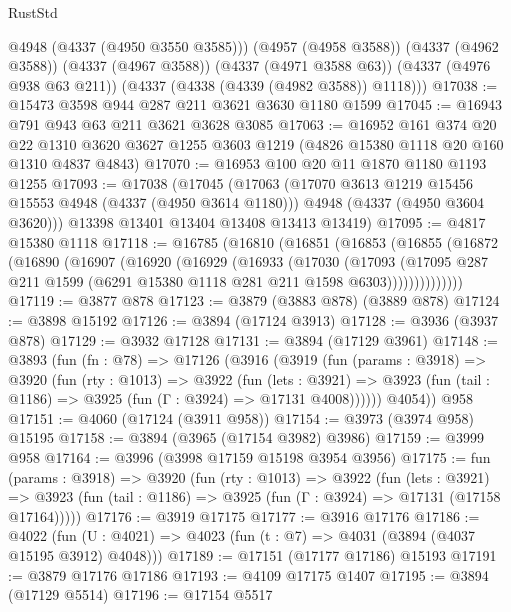 \begin{lexlean}{RustStd}
\begin{coremodule}
        @4948
        (@4337 (@4950 @3550 @3585)))
      (@4957 (@4958 @3588))
      (@4337 (@4962 @3588))
      (@4337 (@4967 @3588))
      (@4337 (@4971 @3588 @63))
      (@4337 (@4976 @938 @63 @211))
      (@4337 (@4338 (@4339 (@4982 @3588)) @1118)))
@17038 := @15473 @3598 @944 @287 @211 @3621 @3630 @1180 @1599
@17045 := @16943 @791 @943 @63 @211 @3621 @3628 @3085
@17063 := @16952
    @161
    @374
    @20
    @22
    @1310
    @3620
    @3627
    @1255
    @3603
    @1219
    (@4826 @15380 @1118 @20 @160 @1310 @4837 @4843)
@17070 := @16953 @100 @20 @11 @1870 @1180 @1193 @1255
@17093 := @17038
    (@17045
      (@17063
        (@17070 @3613 @1219 @15456 @15553 @4948 (@4337 (@4950 @3614 @1180)))
        @4948
        (@4337 (@4950 @3604 @3620)))
      @13398
      @13401
      @13404
      @13408
      @13413
      @13419)
@17095 := @4817 @15380 @1118
@17118 := @16785
    (@16810
      (@16851
        (@16853
          (@16855
            (@16872
              (@16890
                (@16907
                  (@16920
                    (@16929
                      (@16933
                        (@17030
                          (@17093
                            (@17095
                              @287
                              @211
                              @1599
                              (@6291 @15380 @1118 @281 @211 @1598 @6303))))))))))))))
@17119 := @3877 @878
@17123 := @3879 (@3883 @878) (@3889 @878)
@17124 := @3898 @15192
@17126 := @3894 (@17124 @3913)
@17128 := @3936 (@3937 @878)
@17129 := @3932 @17128
@17131 := @3894 (@17129 @3961)
@17148 := @3893
    (fun (fn : @78) =>
    @17126
      (@3916
        (@3919
          (fun (params : @3918) =>
          @3920
            (fun (rty : @1013) =>
            @3922
              (fun (lets : @3921) =>
              @3923 (fun (tail : @1186) => @3925 (fun (Γ : @3924) => @17131 @4008))))))
        @4054))
    @958
@17151 := @4060 (@17124 (@3911 @958))
@17154 := @3973 (@3974 @958) @15195
@17158 := @3894 (@3965 (@17154 @3982) @3986)
@17159 := @3999 @958
@17164 := @3996 (@3998 @17159 @15198 @3954 @3956)
@17175 := fun (params : @3918) =>
  @3920
    (fun (rty : @1013) =>
    @3922
      (fun (lets : @3921) =>
      @3923 (fun (tail : @1186) => @3925 (fun (Γ : @3924) => @17131 (@17158 @17164)))))
@17176 := @3919 @17175
@17177 := @3916 @17176
@17186 := @4022
    (fun (U : @4021) => @4023 (fun (t : @7) => @4031 (@3894 (@4037 @15195 @3912) @4048)))
@17189 := @17151 (@17177 @17186) @15193
@17191 := @3879 @17176 @17186
@17193 := @4109 @17175 @1407
@17195 := @3894 (@17129 @5514)
@17196 := @17154 @5517

\end{coremodule}
\end{lexlean}
